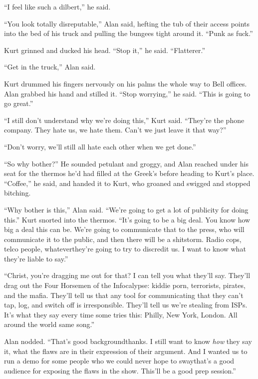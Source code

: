 ``I feel like such a dilbert,'' he said.

``You look totally disreputable,'' Alan said, hefting the tub of their
access points into the bed of his truck and pulling the bungees tight
around it.  ``Punk as fuck.''

Kurt grinned and ducked his head.  ``Stop it,'' he said. 
``Flatterer.''

``Get in the truck,'' Alan said.

Kurt drummed his fingers nervously on his palms the whole way to Bell
offices.  Alan grabbed his hand and stilled it.  ``Stop worrying,'' he
said.  ``This is going to go great.''

``I still don't understand why we're doing this,'' Kurt said. 
``They're the phone company.  They hate us, we hate them.  Can't we
just leave it that way?''

``Don't worry, we'll still all hate each other when we get done.''

``So why bother?'' He sounded petulant and groggy, and Alan reached
under his seat for the thermos he'd had filled at the Greek's before
heading to Kurt's place.  ``Coffee,'' he said, and handed it to Kurt,
who groaned and swigged and stopped bitching.

``Why bother is this,'' Alan said.  ``We're going to get a lot of
publicity for doing this.'' Kurt snorted into the thermos.  ``It's
going to be a big deal.  You know how big a deal this can be.  We're
going to communicate that to the press, who will communicate it to the
public, and then there will be a shitstorm.  Radio cops, telco people,
whatever\dash{}they're going to try to discredit us.  I want to know what
they're liable to say.''

``Christ, you're dragging me out for that?  I can tell you what
they'll say.  They'll drag out the Four Horsemen of the Infocalypse: 
kiddie porn, terrorists, pirates, and the mafia.  They'll tell us that
any tool for communicating that they can't tap, log, and switch off is
irresponsible.  They'll tell us we're stealing from ISPs.  It's what
they say every time some tries this:  Philly, New York, London.  All
around the world same song.''

Alan nodded.  ``That's good background\dash{}thanks.  I still want to know
\textit{how} they say it, what the flaws are in their expression of
their argument.  And I wanted us to run a demo for some people who we
could never hope to sway\dash{}that's a good audience for exposing the
flaws in the show.  This'll be a good prep session.''

